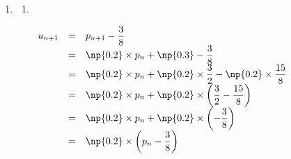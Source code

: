 \begin{enumerate}
\begin{enumerate}
\textbf{On vérifie que $\mathcal{H}(0)$ est vraie (initialisation).}

Comme $p_0 = 0 \leqslant \np{0.375}$,  $\mathcal{H}(0)$ est vraie.

\textbf{Montrons que $\mathcal{H}(n)\Rightarrow \mathcal{H}(n+1)$ (hérédité).}

On suppose que $\mathcal{H}(n)$ est vraie, avec $n \in \N$.

$p_{n+1} = \np{0.2}\times p_n + \np{0.3}$

D'après $\mathcal{H}(n)$, $p_n \leqslant \np{0.375}$, en multipliant par $\np{0.2}$ on obtient :

$ \np{0.2}\times p_n \leqslant \np{0.075}$, en ajoutant  $\np{0.3}$ on obtient :

$ \np{0.2}\times p_n + \np{0.3} \leqslant \np{0.375}$, ainsi on obtient :

$p_{n+1} \leqslant \np{0.375} $ ($\mathcal{H}(n+1)$ est vérifiée)

\textbf{D'après le principe de récurrence},

$\forall n\in \N, n \geqslant 0, p_n\leqslant \np{0.375}$
		\item Pour tout $n\in \N$, $p_n$ désignant une probabilité est un nombre positif.

Soit ${n\in\N}$

$p_{n+1}-p_{n} = \np{-0.8}\times p_n + \np{0.3} $

$p_{n+1}-p_{n} \geqslant \np{-0.8}\times \np{0.375} + \np{0.3} $

$p_{n+1}-p_{n} \geqslant 0 $

Ceci étant valable quelque soit le choix de $n$, $\forall n \in \N,~p_{n+1}-p_{n} \geqslant 0 $, donc $\left(p_n\right)$ est croissante.
			\item $\left(p_n\right)$ est croissante et majorée donc $\left(p_n\right)$ est convergente vers $l$. De plus ${l\leqslant \np{0.375}}$.
		\end{enumerate}
	\item
		\begin{enumerate}
			\item \ {}
			
			\renewcommand{\arraystretch}{2}
			$\begin{array}{rcl}
			u_{n+1} 	&=& p_{n+1} - \dfrac{3}{8}\\
					&=& \np{0.2}\times p_n + \np{0.3} - \dfrac{3}{8}\\
					&=& \np{0.2}\times p_n +\np{0.2}\times \dfrac{3}{2} - \np{0.2}\times\dfrac{15}{8}\\
					&=& \np{0.2}\times p_n +\np{0.2}\times\left( \dfrac{3}{2} - \dfrac{15}{8}\right)\\
					&=& \np{0.2}\times p_n +\np{0.2}\times\left(  - \dfrac{3}{8}\right)\\
					&=& \np{0.2}\times \left(p_n - \dfrac{3}{8}\right)\\
			\end{array}$


\end{enumerate}
\end{enumerate}
